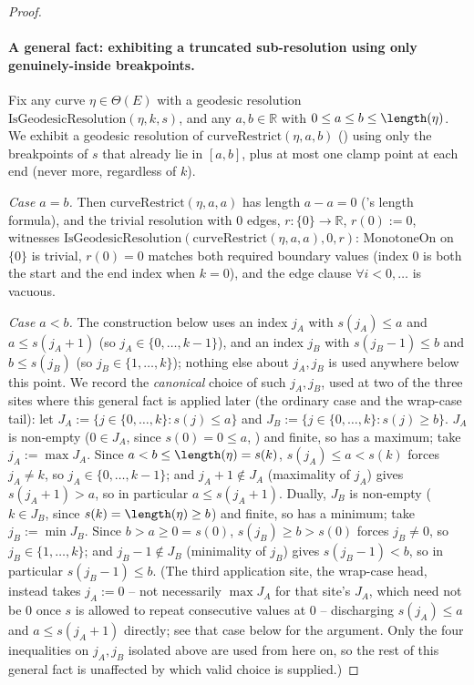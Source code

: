 \begin{proof}
  \paragraph{A general fact: exhibiting a truncated sub-resolution using only genuinely-inside
  breakpoints.} Fix any curve $\eta \in \Theta(E)$ with a geodesic resolution
  $\mathrm{IsGeodesicResolution}(\eta,k,s)$, and any $a,b \in \mathbb{R}$ with $0 \le a \le b \le
  \length(\eta)$. We exhibit a geodesic resolution of $\mathrm{curveRestrict}(\eta,a,b)$
  () using only the breakpoints of $s$ that already lie in $[a,b]$, plus at
  most one clamp point at each end (never more, regardless of $k$).

  \emph{Case $a=b$.} Then $\mathrm{curveRestrict}(\eta,a,a)$ has length $a-a=0$
  ('s length formula), and the trivial resolution with $0$ edges,
  $r\colon\{0\}\to\mathbb{R}$, $r(0):=0$, witnesses
  $\mathrm{IsGeodesicResolution}(\mathrm{curveRestrict}(\eta,a,a),0,r)$: $\mathrm{MonotoneOn}$ on
  $\{0\}$ is trivial, $r(0)=0$ matches both required boundary values (index $0$ is both the start
  and the end index when $k=0$), and the edge clause $\forall i<0,\dots$ is vacuous.

  \emph{Case $a<b$.} The construction below uses an index $j_A$ with $s(j_A)\le a$ and $a\le
  s(j_A+1)$ (so $j_A\in\{0,\dots,k-1\}$), and an index $j_B$ with $s(j_B-1)\le b$ and $b\le
  s(j_B)$ (so $j_B\in\{1,\dots,k\}$); nothing else about $j_A,j_B$ is used anywhere below this
  point. We record the \emph{canonical} choice of such $j_A,j_B$, used at two of the three sites
  where this general fact is applied later (the ordinary case and the wrap-case tail): let
  $J_A := \{j \in \{0,\dots,k\} : s(j) \le a\}$ and $J_B := \{j \in \{0,\dots,k\} : s(j) \ge b\}$.
  $J_A$ is non-empty ($0 \in J_A$, since $s(0)=0\le a$, ) and finite,
  so has a maximum; take $j_A := \max J_A$. Since $a<b\le\length(\eta)=s(k)$, $s(j_A)\le a<s(k)$
  forces $j_A\ne k$, so $j_A\in\{0,\dots,k-1\}$; and $j_A+1\notin J_A$ (maximality of $j_A$) gives
  $s(j_A+1)>a$, so in particular $a\le s(j_A+1)$. Dually, $J_B$ is non-empty ($k \in J_B$, since
  $s(k)=\length(\eta)\ge b$) and finite, so has a minimum; take $j_B := \min J_B$. Since
  $b>a\ge0=s(0)$, $s(j_B)\ge b>s(0)$ forces $j_B\ne0$, so $j_B\in\{1,\dots,k\}$; and $j_B-1\notin
  J_B$ (minimality of $j_B$) gives $s(j_B-1)<b$, so in particular $s(j_B-1)\le b$. (The third
  application site, the wrap-case head, instead takes $j_A:=0$ -- not necessarily $\max J_A$ for
  that site's $J_A$, which need not be $0$ once $s$ is allowed to repeat consecutive values at
  $0$ -- discharging $s(j_A)\le a$ and $a\le s(j_A+1)$ directly; see that case below for the
  argument. Only the four inequalities on $j_A,j_B$ isolated above are used from here on, so the
  rest of this general fact is unaffected by which valid choice is supplied.)


\end{proof}
